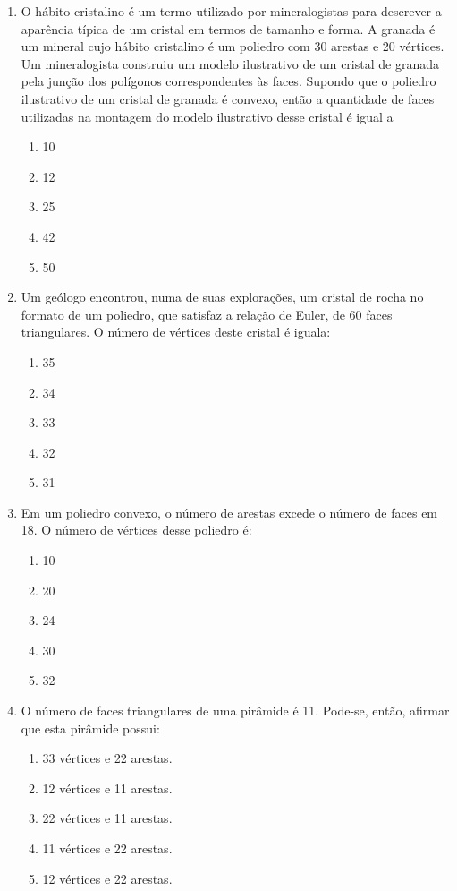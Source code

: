 \documentclass[twocolumn,oneside,a4paper,12pt]{article}
\begin{document}
\begin{enumerate}
\item O hábito cristalino é um termo utilizado por mineralogistas para descrever a aparência típica de um cristal em termos de tamanho e forma. A granada é um mineral cujo hábito cristalino é um poliedro com 30 arestas e 20 vértices. Um mineralogista construiu um modelo ilustrativo de um cristal de granada pela junção dos polígonos correspondentes às faces. Supondo que o poliedro ilustrativo de um cristal de granada é convexo, então a quantidade de faces utilizadas na montagem do modelo ilustrativo desse cristal é igual a
\begin{enumerate}
\item 10
\item 12
\item 25
\item 42
\item 50
\end{enumerate}

\item Um geólogo encontrou, numa de suas explorações, um cristal de rocha no formato de um poliedro, que satisfaz a relação de Euler, de 60 faces triangulares. O número de vértices deste cristal é iguala:
\begin{enumerate}
\item 35
\item 34
\item 33
\item 32
\item 31
\end{enumerate}


\item Em um poliedro convexo, o número de arestas excede o número de faces em 18. O número de vértices desse poliedro é:
\begin{enumerate}
\item 10
\item 20
\item 24
\item 30
\item 32
\end{enumerate}

\item O número de faces triangulares de uma pirâmide é 11. Pode-se, então, afirmar que esta pirâmide possui:
\begin{enumerate}
\item 33 vértices e 22 arestas.
\item 12 vértices e 11 arestas.
\item 22 vértices e 11 arestas.
\item 11 vértices e 22 arestas.
\item 12 vértices e 22 arestas.
\end{enumerate}


\end{enumerate}
\end{document}
